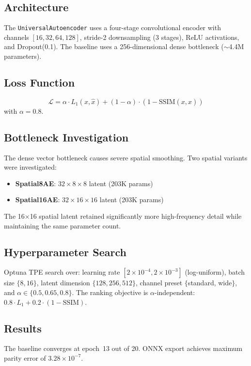 \documentclass[conference]{IEEEtran}
\begin{document}
\subsection{Architecture}
The \texttt{UniversalAutoencoder} uses a four-stage convolutional encoder with channels $[16, 32, 64, 128]$, stride-2 downsampling (3 stages), ReLU activations, and Dropout(0.1). The baseline uses a 256-dimensional dense bottleneck ($\sim$4.4M parameters).

\subsection{Loss Function}
\begin{equation}
\mathcal{L} = \alpha \cdot L_1(x, \hat{x}) + (1-\alpha) \cdot (1 - \text{SSIM}(x, \hat{x}))
\end{equation}
with $\alpha = 0.8$.

\subsection{Bottleneck Investigation}
The dense vector bottleneck causes severe spatial smoothing. Two spatial variants were investigated:
\begin{itemize}
\item \textbf{Spatial8AE}: $32 \times 8 \times 8$ latent (203K params)
\item \textbf{Spatial16AE}: $32 \times 16 \times 16$ latent (203K params)
\end{itemize}
The 16$\times$16 spatial latent retained significantly more high-frequency detail while maintaining the same parameter count.

\subsection{Hyperparameter Search}
Optuna TPE search over: learning rate $[2 \times 10^{-4}, 2 \times 10^{-3}]$ (log-uniform), batch size $\{8, 16\}$, latent dimension $\{128, 256, 512\}$, channel preset $\{$standard, wide$\}$, and $\alpha \in \{0.5, 0.65, 0.8\}$. The ranking objective is $\alpha$-independent: $0.8 \cdot L_1 + 0.2 \cdot (1 - \text{SSIM})$.

\subsection{Results}
The baseline converges at epoch~13 out of 20. ONNX export achieves maximum parity error of $3.28 \times 10^{-7}$.
\end{document}
